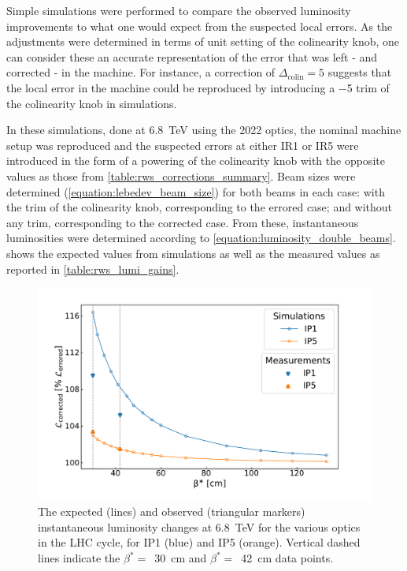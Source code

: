Simple simulations were performed to compare the observed luminosity improvements to what one would expect from the suspected local errors.
As the adjustments were determined in terms of unit setting of the colinearity knob, one can consider these an accurate representation of the error that was left - and corrected - in the machine.
For instance, a correction of \(\Delta_{\mathrm{colin}} = 5\) suggests that the local error in the machine could be reproduced by introducing a \num{-5} trim of the colinearity knob in simulations.

In these simulations, done at \qty{6.8}{\tera\electronvolt} using the \num{2022} optics, the nominal machine setup was reproduced and the suspected errors at either IR\num{1} or IR\num{5} were introduced in the form of a powering of the colinearity knob with the opposite values as those from \cref{table:rws_corrections_summary}.
Beam sizes were determined (\cref{equation:lebedev_beam_size}) for both beams in each case: with the trim of the colinearity knob, corresponding to the errored case; and without any trim, corresponding to the corrected case.
From these, instantaneous luminosities were determined according to \cref{equation:luminosity_double_beams}.
 shows the expected values from simulations as well as the measured values as reported in \cref{table:rws_lumi_gains}.

\begin{figure}[!htb]
    \centering
    \includegraphics*[width=\textwidth]{Figures/IR_Coupling_Correction/expected_vs_observed_lumigains.pdf}
    \caption{The expected (lines) and observed (triangular markers) instantaneous luminosity changes at \qty{6.8}{\tera\electronvolt} for the various optics in the LHC cycle, for IP\num{1} (\textcolor{mplblue}{blue}) and IP\num{5} (\textcolor{mplorange}{orange}). Vertical dashed lines indicate the \(\beta^{\ast} =\)~\qty{30}{\centi\meter} and \(\beta^{\ast} =\)~\qty{42}{\centi\meter} data points.}
    \label{figure:expected_vs_observed_lumigains}
\end{figure}


